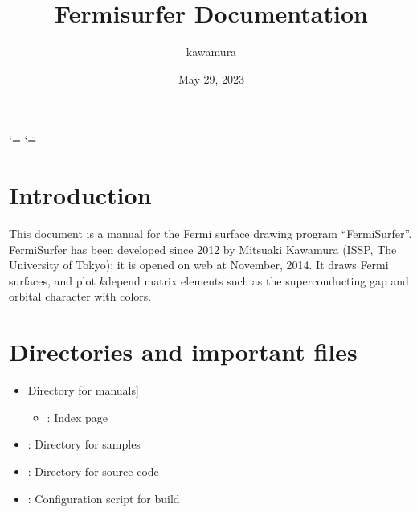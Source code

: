 \documentclass[letterpaper,10pt,pdftex,openany,english]{sphinxmanual}
\title{Fermisurfer Documentation}
\date{May 29, 2023}
\author{kawamura}
\begin{document}
\ifdefined\shorthandoff
  \ifnum\catcode`\=\string=\active\shorthandoff{=}\fi
  \ifnum\catcode`\"=\active{}\fi
\fi

\pagestyle{empty}
\sphinxmaketitle
\pagestyle{plain}
\sphinxtableofcontents
\pagestyle{normal}
\label{\detokenize{index::doc}}


\sphinxstepscope


\chapter{Introduction}
\label{\detokenize{overview:introduction}}\label{\detokenize{overview::doc}}
\sphinxAtStartPar
This document is a manual for the Fermi surface drawing program
“FermiSurfer”. FermiSurfer has been developed since 2012 by Mitsuaki
Kawamura (ISSP, The University of Tokyo); it is opened on web at
November, 2014. It draws Fermi surfaces, and plot \(k\)\sphinxhyphen{}depend matrix
elements such as the superconducting gap and orbital character with
colors.

\sphinxstepscope


\chapter{Directories and important files}
\label{\detokenize{file:directories-and-important-files}}\label{\detokenize{file::doc}}\begin{itemize}
\item {} \begin{description}
\sphinxlineitem{\sphinxcode{\sphinxupquote{doc/}}}{[}Directory for manuals{]}\begin{itemize}
\item {} 
\sphinxAtStartPar
{} : Index page

\end{itemize}

\end{description}

\item {} 
\sphinxAtStartPar
{} : Directory for samples

\item {} 
\sphinxAtStartPar
{} : Directory for source code

\item {} 
\sphinxAtStartPar
{} : Configuration script for build

\end{itemize}
\end{document}
